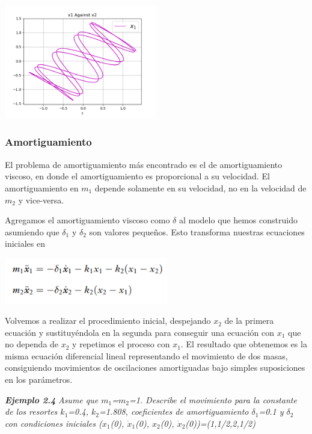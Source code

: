 \documentclass{article}
\begin{document}
\begin{center}
\includegraphics[height=5cm]{ejemplo2_3_pt6.png}
\end{center}

\subsubsection{Amortiguamiento}
El problema de amortiguamiento más encontrado es el de amortiguamiento viscoso, en donde el amortiguamiento es proporcional a su velocidad. El amortiguamiento en $m_1$ depende solamente en su velocidad, no en la velocidad de $m_2$ y vice-versa. 

Agregamos el amortiguamiento viscoso como $\delta$ al modelo que hemos construido  asumiendo que $\delta$$_1$ y $\delta$$_2$ son valores pequeños. Esto transforma nuestras ecuaciones iniciales en

\begin{center}
\includegraphics[height=2cm]{ec2_16.png}
\end{center}

Volvemos a realizar el procedimiento inicial, despejando $x_2$ de la primera ecuación y sustituyéndola en la segunda para conseguir una ecuación con $x_1$ que no dependa de $x_2$ y repetimos el proceso con $x_1$. El resultado que obtenemos es la misma ecuación diferencial lineal representando el movimiento de dos masas, consiguiendo movimientos de oscilaciones amortiguadas bajo simples suposiciones en los parámetros. 

\textbf{\textit{Ejemplo 2.4}}
\textit{Asume que $m_1$=$m_2$=1. Describe el movimiento para la constante de los resortes $k_1$=0.4, $k_2$=1.808, coeficientes de amortiguamiento $\delta$$_1$=0.1 y $\delta$$_2$ con condiciones iniciales ($x_1$(0), $\dot{x}_1$(0), $x_2$(0), $\dot{x}_2$(0))=(1,1/2,2,1/2)}
\end{document}
